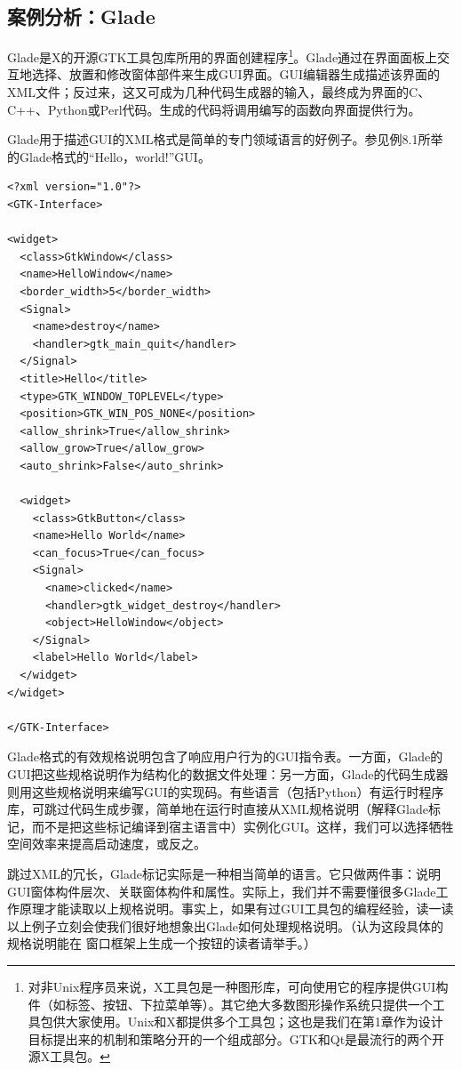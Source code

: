 \documentclass[12pt,oneside]{book}
\begin{document}
\subsection{案例分析：Glade}
Glade是X的开源GTK工具包库所用的界面创建程序\footnote{对非Unix程序员来说，X工具包是一种图形库，可向使用它的程序提供GUI构件（如标签、按钮、下拉菜单等）。其它绝大多数图形操作系统只提供一个工具包供大家使用。Unix和X都提供多个工具包；这也是我们在第1章作为设计目标提出来的机制和策略分开的一个组成部分。GTK和Qt是最流行的两个开源X工具包。}。Glade通过在界面面板上交互地选择、放置和修改窗体部件来生成GUI界面。GUI编辑器生成描述该界面的XML文件；反过来，这又可成为几种代码生成器的输入，最终成为界面的C、C++、Python或Perl代码。生成的代码将调用编写的函数向界面提供行为。

Glade用于描述GUI的XML格式是简单的专门领域语言的好例子。参见例8.1所举的Glade格式的“Hello，world!”GUI。
\begin{Verbatim}[label=例 8.1 Glade "Hello， World"]
<?xml version="1.0"?>
<GTK-Interface>

<widget>
  <class>GtkWindow</class>
  <name>HelloWindow</name>
  <border_width>5</border_width>
  <Signal>
    <name>destroy</name>
    <handler>gtk_main_quit</handler>
  </Signal>
  <title>Hello</title>
  <type>GTK_WINDOW_TOPLEVEL</type>
  <position>GTK_WIN_POS_NONE</position>
  <allow_shrink>True</allow_shrink>
  <allow_grow>True</allow_grow>
  <auto_shrink>False</auto_shrink>

  <widget>
    <class>GtkButton</class>
    <name>Hello World</name>
    <can_focus>True</can_focus>
    <Signal>
      <name>clicked</name>
      <handler>gtk_widget_destroy</handler>
      <object>HelloWindow</object>
    </Signal>
    <label>Hello World</label>
  </widget>
</widget>

</GTK-Interface>
\end{Verbatim}

Glade格式的有效规格说明包含了响应用户行为的GUI指令表。一方面，Glade的GUI把这些规格说明作为结构化的数据文件处理：另一方面，Glade的代码生成器则用这些规格说明来编写GUI的实现码。有些语言（包括Python）有运行时程序库，可跳过代码生成步骤，简单地在运行时直接从XML规格说明（解释Glade标记，而不是把这些标记编译到宿主语言中）实例化GUI。这样，我们可以选择牺牲空间效率来提高启动速度，或反之。

跳过XML的冗长，Glade标记实际是一种相当简单的语言。它只做两件事：说明GUI窗体构件层次、关联窗体构件和属性。实际上，我们并不需要懂很多Glade工作原理才能读取以上规格说明。事实上，如果有过GUI工具包的编程经验，读一读以上例子立刻会使我们很好地想象出Glade如何处理规格说明。（认为这段具体的规格说明能在
窗口框架上生成一个按钮的读者请举手。）
\end{document}
